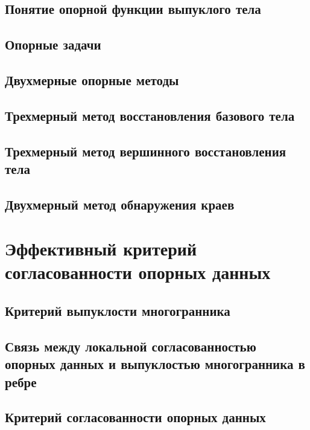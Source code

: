 \documentclass[a4paper, 12pt, titlepage]{article}
\theoremstyle{definition}
\theoremstyle{plain}
\theoremstyle{plain}
\begin{document}
\subsection{Понятие опорной функции выпуклого тела}

\subsection{Опорные задачи}

\subsection{Двухмерные опорные методы}

\subsection{Трехмерный метод восстановления базового тела}

\subsection{Трехмерный метод вершинного восстановления тела}

\subsection{Двухмерный метод обнаружения краев}


\section{Эффективный критерий согласованности опорных данных}

\subsection{Критерий выпуклости многогранника}

\subsection{Связь между локальной согласованностью опорных данных и выпуклостью
многогранника в ребре}

\subsection{Критерий согласованности опорных данных}
\end{document}
